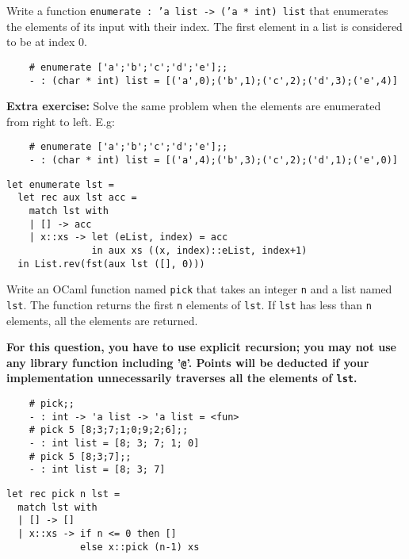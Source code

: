 \documentclass[addpoints]{exam}
\begin{document}
\begin{questions}
  
  \question
  Write a function 
  \texttt{enumerate : 'a list -> ('a * int) list} 
  that enumerates the elements of its input with their index.
  The first element in a list is considered to be at index 0.
  \begin{verbatim}
    # enumerate ['a';'b';'c';'d';'e'];;
    - : (char * int) list = [('a',0);('b',1);('c',2);('d',3);('e',4)]
  \end{verbatim}
  \textbf{Extra exercise:} Solve the same problem when the elements are 
  enumerated from right to left. E.g:
  \begin{verbatim}
    # enumerate ['a';'b';'c';'d';'e'];;
    - : (char * int) list = [('a',4);('b',3);('c',2);('d',1);('e',0)]
  \end{verbatim}

  \begin{solutionbox}{4.5cm}
    \begin{verbatim}
let enumerate lst =
  let rec aux lst acc =
    match lst with
    | [] -> acc
    | x::xs -> let (eList, index) = acc
               in aux xs ((x, index)::eList, index+1)
  in List.rev(fst(aux lst ([], 0)))
    \end{verbatim}
  \end{solutionbox}

  \question
  Write an OCaml function named \texttt{pick} that takes an integer \texttt{n} and
  a list named \texttt{lst}. The function returns the first \texttt{n}
  elements of \texttt{lst}. If \texttt{lst} has less than \texttt{n} elements,
  all the elements are returned.

  \textbf{For this question, you have to use explicit recursion;
    you may not use any library function including '\texttt{@}'.
    Points will be deducted if your implementation unnecessarily traverses all the
    elements of \texttt{lst}.
  }
  \begin{verbatim}
    # pick;;
    - : int -> 'a list -> 'a list = <fun>
    # pick 5 [8;3;7;1;0;9;2;6];;
    - : int list = [8; 3; 7; 1; 0]
    # pick 5 [8;3;7];;          
    - : int list = [8; 3; 7]
  \end{verbatim}
  \strut

  \begin{solutionbox}{3.5cm}
    \begin{verbatim}
let rec pick n lst =
  match lst with
  | [] -> []
  | x::xs -> if n <= 0 then []
             else x::pick (n-1) xs
    \end{verbatim}
  \end{solutionbox}


\end{questions}
\end{document}
